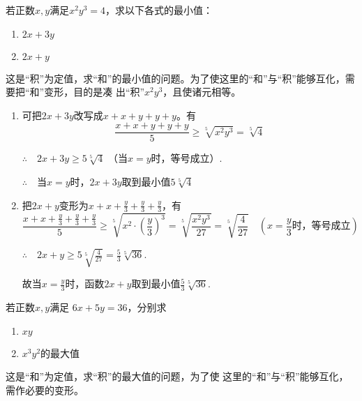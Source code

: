 \begin{example}
若正数$x,y$满足$x^2y^3=4$，求以下各式的最小值：
\begin{multicols}{2}
\begin{enumerate}[(1)]
    \item $2x+3y$
    \item $2x+y$
\end{enumerate}
\end{multicols}
\end{example}

\begin{analyze}
这是“积”为定值，求“和”的最小值的问题。为了使这里的“和”与“积”能够互化，需要把“和”变形，目的是凑
出“积”$x^2y^3$，且使诸元相等。
\end{analyze}

\begin{solution}
\begin{enumerate}[(1)]
    \item 可把$2x+3y$改写成$x+x+y+y+y$。有
\[\frac{x+x+y+y+y}{5}\ge \sqrt[5]{x^2y^3}=\sqrt[5]{4}\]

$\therefore\quad 2x+3y\ge 5\sqrt[5]{4}$ （当$x=y$时，等号成立）.

$\therefore\quad $当$x=y$时，$2x+3y$取到最小值$5\sqrt[5]{4}$

\item 把$2x+y$变形为$x+x+\frac{y}{3}+\frac{y}{3}+\frac{y}{3}$，有
\[\frac{x+x+\frac{y}{3}+\frac{y}{3}+\frac{y}{3}}{5}\ge \sqrt[5]{x^2\cdot \left(\frac{y}{3}\right)^3}=\sqrt[5]{\frac{x^2y^3}{27}}=\sqrt[5]{\frac{4}{27}}\quad \left(\text{$x=\frac{y}{3}$时，等号成立}\right)\]

$\therefore\quad 2x+y\ge 5\sqrt[5]{\frac{4}{27}}=\frac{5}{3}\sqrt[5]{36}$.

故当$x=\frac{y}{3}$时，函数$2x+y$取到最小值$\frac{5}{3}\sqrt[5]{36}$.
\end{enumerate}
\end{solution}

\begin{example}
若正数$x,y$满足
$6x+5y=36$，分别求
\begin{multicols}{2}
\begin{enumerate}[(1)]
    \item $xy$
    \item $x^3y^2$的最大值
\end{enumerate}
\end{multicols} 
\end{example}

\begin{analyze}
 这是“和”为定值，求“积”的最大值的问题，为了使
这里的“和”与“积”能够互化，需作必要的变形。   
\end{analyze}

